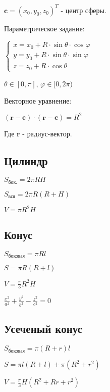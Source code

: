 $ \boldsymbol{c} = (x_0, y_0, z_0)^T $ - центр сферы.

Параметрическое задание:

$\begin{cases}
	x = x_0 + R\cdot \sin\theta \cdot \cos \varphi \\
	y = y_0 + R\cdot \sin\theta \cdot \sin \varphi \\
	z = z_0 + R\cdot \cos\theta
\end{cases} $

$ \theta \in [0, \pi] $, $ \varphi \in [0, 2\pi) $

Векторное уравнение:

$ (\boldsymbol{r} - \boldsymbol{c})\cdot (\boldsymbol{r} - \boldsymbol{c}) = R^2 $

Где $\boldsymbol{r}$ - радиус-вектор. 

\subsection{Цилиндр}

$ S_\text{бок.} = 2 \pi R H $

$ S_\text{вся} = 2 \pi R (R+H) $

$ V = \pi R^2 H $

\subsection{Конус}

$ S_{\text{боковая}} = \pi R l $

$ S = \pi R (R + l) $

$ V = \frac{\pi}{3} R^2 H $

$ \frac{x^2}{a^2} + \frac{y^2}{b^2} - \frac{z^2}{c^2} = 0 $

\subsection{Усеченый конус}

$ S_{\text{боковая}} = \pi (R+r) l $

$ S = \pi l (R + l) + \pi (R^2 + r^2) $

$ V = \frac{\pi}{3} H (R^2 + Rr + r^2) $